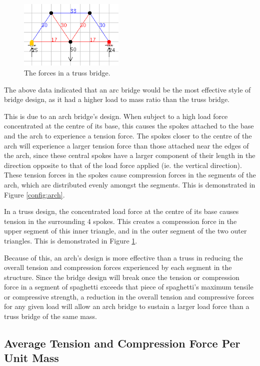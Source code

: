 \documentclass[a4paper,11pt]{article}
\begin{document}
\begin{figure}
\begin{center}
\includegraphics[width=5cm]{figures/truss-1.png}
\end{center}
\caption{The forces in a truss bridge.}
\label{config:truss}
\end{figure}

The above data indicated that an arc bridge would be the most effective style of
bridge design, as it had a higher load to mass ratio than the truss bridge.

This is due to an arch bridge's design.
When subject to a high load force concentrated at the centre of its base, this
causes the spokes attached to the base and the arch to experience a tension
force.
The spokes closer to the centre of the arch will experience a larger tension
force than those attached near the edges of the arch, since these central spokes
have a larger component of their length in the direction opposite to that of the
load force applied (ie. the vertical direction).
These tension forces in the spokes cause compression forces in the segments of
the arch, which are distributed evenly amongst the segments.
This is demonstrated in Figure \ref{config:arch}.

In a truss design, the concentrated load force at the centre of its base causes
tension in the surrounding 4 spokes.
This creates a compression force in the upper segment of this inner triangle,
and in the outer segment of the two outer triangles.
This is demonstrated in Figure \ref{config:truss}.

Because of this, an arch's design is more effective than a truss in reducing
the overall tension and compression forces experienced by each segment in the
structure.
Since the bridge design will break once the tension or compression force in a
segment of spaghetti exceeds that piece of spaghetti's maximum tensile or
compressive strength, a reduction in the overall tension and compressive forces
for any given load will allow an arch bridge to sustain a larger load force
than a truss bridge of the same mass.


\subsection{Average Tension and Compression Force Per Unit Mass}
\end{document}
